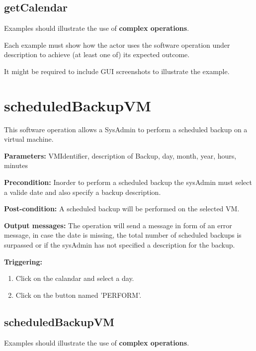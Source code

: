 \subsection{getCalendar}
Examples should illustrate the use of \textbf{complex operations}.

Each example must show how the actor uses the software operation under
description to achieve (at least one of) its expected outcome.

It might be required to include GUI screenshots to illustrate the example.









\section{scheduledBackupVM}
\label{operation:scheduledBackupVM}
This software operation allows a SysAdmin to perform a scheduled backup on a
virtual machine.
\begin{description}

\item \textbf{Parameters:} VMIdentifier, description of Backup, day, month,
year, hours, minutes
\item \textbf{Precondition:} Inorder to perform a scheduled backup the sysAdmin
must select a valide date and also specify a backup description.
\item \textbf{Post-condition:} A scheduled backup will be performed on the
selected VM.
\item \textbf{Output messages:} The operation will send a message in
form of an error message, in case the date is missing, the total number of
scheduled backups is surpassed or if the sysAdmin has not specified a
description for the backup.

\item \textbf{Triggering:}
\begin{enumerate}
\item Click on the calandar and select a day.
\item Click on the button named 'PERFORM'.
\end{enumerate}

 
\end{description}


\subsection{scheduledBackupVM}
Examples should illustrate the use of \textbf{complex operations}.

